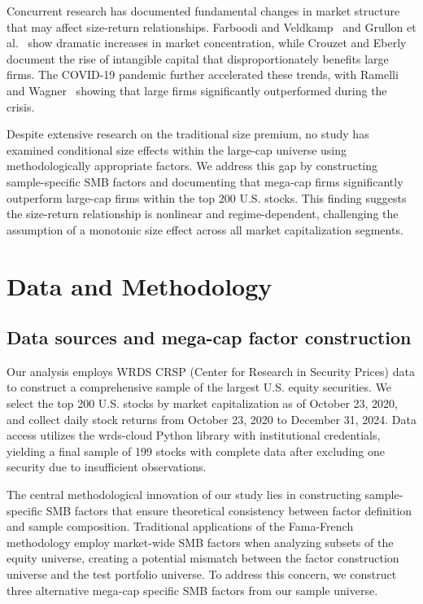 \documentclass[10pt,letterpaper]{article}
\begin{document}
Concurrent research has documented fundamental changes in market structure that may affect size-return relationships. Farboodi and Veldkamp~\cite{farboodi2020} and Grullon et al.~\cite{grullon2019} show dramatic increases in market concentration, while Crouzet and Eberly~\cite{crouzet2019} document the rise of intangible capital that disproportionately benefits large firms. The COVID-19 pandemic further accelerated these trends, with Ramelli and Wagner~\cite{ramelli2020} showing that large firms significantly outperformed during the crisis.

Despite extensive research on the traditional size premium, no study has examined conditional size effects within the large-cap universe using methodologically appropriate factors. We address this gap by constructing sample-specific SMB factors and documenting that mega-cap firms significantly outperform large-cap firms within the top 200 U.S. stocks. This finding suggests the size-return relationship is nonlinear and regime-dependent, challenging the assumption of a monotonic size effect across all market capitalization segments.

\section*{Data and Methodology}

\subsection*{Data sources and mega-cap factor construction}

Our analysis employs WRDS CRSP (Center for Research in Security Prices) data to construct a comprehensive sample of the largest U.S. equity securities. We select the top 200 U.S. stocks by market capitalization as of October 23, 2020, and collect daily stock returns from October 23, 2020 to December 31, 2024. Data access utilizes the wrds-cloud Python library with institutional credentials, yielding a final sample of 199 stocks with complete data after excluding one security due to insufficient observations.

The central methodological innovation of our study lies in constructing sample-specific SMB factors that ensure theoretical consistency between factor definition and sample composition. Traditional applications of the Fama-French methodology employ market-wide SMB factors when analyzing subsets of the equity universe, creating a potential mismatch between the factor construction universe and the test portfolio universe. To address this concern, we construct three alternative mega-cap specific SMB factors from our sample universe.
\end{document}
